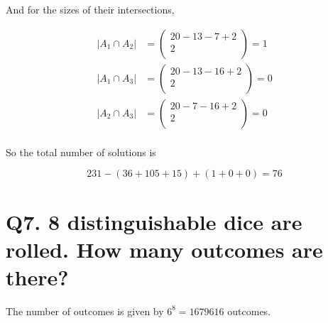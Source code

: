 \documentclass{article}
\begin{document}
And for the sizes of their intersections,

\begin{align*}
  |A_1 \cap A_2| &= 
  \begin{pmatrix}
    20 - 13 - 7 + 2 \\ 2 \\ 
  \end{pmatrix}
  = 1 \\
  |A_1 \cap A_3| &=
  \begin{pmatrix}
    20 - 13 - 16 + 2 \\ 2 \\ 
  \end{pmatrix}
  = 0 \\
  |A_2 \cap A_3| &=
  \begin{pmatrix}
    20 - 7 - 16 + 2 \\ 2 \\ 
  \end{pmatrix}
  = 0 \\
\end{align*}

So the total number of solutions is 

$$231 - (36 + 105 + 15) + (1 + 0 + 0) = 76$$



\section*{Q7. \normalsize 8 distinguishable dice are rolled. How many outcomes are there?}

The number of outcomes is given by $6^8 = 1679616$ outcomes.
\end{document}
